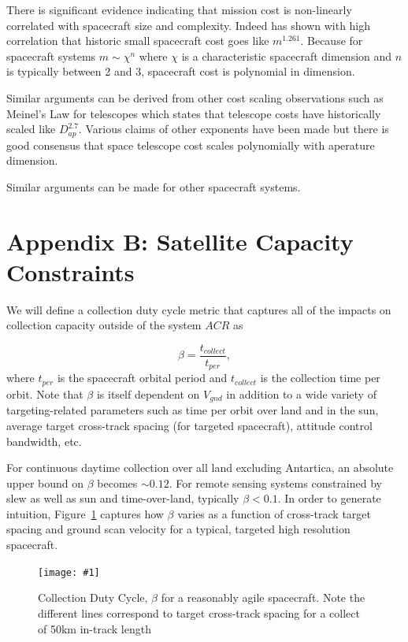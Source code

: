 \documentclass[]{spieman}  %
\newcommand{\includefigure}[3]
{
  \begin{figure}[h!tb]
  \centering
  \texttt{[image: \#1]}
  \caption[]{#3}
  \label{#2}
  \end{figure}
}
\begin{document}
There is significant evidence indicating that mission cost is non-linearly correlated with spacecraft size and complexity.  Indeed \cite{bearden} has shown with high correlation that historic small spacecraft cost goes like $m^{1.261}$. Because for spacecraft systems $m \sim \chi^n$ where $\chi$ is a characteristic spacecraft dimension and $n$ is typically between 2 and 3, spacecraft cost is polynomial in dimension.

Similar arguments can be derived from other cost scaling observations such as Meinel's Law \cite{meinel} for telescopes which states that telescope costs have historically scaled like $D_{ap}^{2.7}$.  Various claims of other exponents have been made but there is good consensus that space telescope cost scales polynomially with aperature dimension.

Similar arguments can be made for other spacecraft systems.

\section{Appendix B: Satellite Capacity Constraints}
\label{sec:appendix_b}

We will define a collection duty cycle metric that captures all of the impacts on collection capacity outside of the system $ACR$ as

\begin{equation}
    \beta = \frac{t_{collect}}{t_{per}},
\end{equation} 
where $t_{per}$ is the spacecraft orbital period and $t_{collect}$ is the collection time per orbit.  Note that $\beta$ is itself dependent on $V_{gnd}$ in addition to a wide variety of targeting-related parameters such as time per orbit over land and in the sun, average target cross-track spacing (for targeted spacecraft), attitude control bandwidth, etc.

For continuous daytime collection over all land excluding Antartica, an absolute upper bound on $\beta$ becomes $\sim 0.12$.  For remote sensing systems constrained by slew as well as sun and time-over-land, typically $\beta < 0.1$.  In order to generate intuition, Figure~\ref{fig:beta} captures how $\beta$ varies as a function of cross-track target spacing and ground scan velocity for a typical, targeted high resolution spacecraft.

\includefigure{figures/collection_dc.pgf}{fig:beta}{Collection Duty Cycle, $\beta$ for a reasonably agile spacecraft.  Note the different lines correspond to target cross-track spacing for a collect of 50km in-track length}
\end{document}
